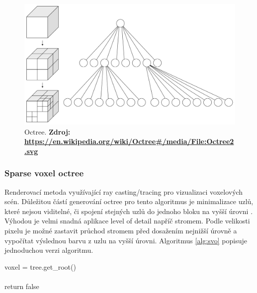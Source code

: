 \begin{figure}[H]
	\centering
	\includegraphics[scale=0.1]{obrazky-figures/Octree2.pdf}
	\caption{Octree. \textbf{Zdroj: \url{https://en.wikipedia.org/wiki/Octree#/media/File:Octree2.svg}}}
	\label{fig:slabs}
\end{figure}


\subsubsection{Sparse voxel octree}
Renderovací metoda využívající ray casting/tracing pro vizualizaci voxelových scén. Důležitou částí generování octree pro tento algoritmus je minimalizace uzlů, které nejsou viditelné, či spojení stejných uzlů do jednoho bloku na vyšší úrovni \cite{Laine2011EfficientSV}. Výhodou je velmi snadná aplikace level of detail napříč stromem. Podle velikosti pixelu je možné zastavit průchod stromem před dosažením nejnižší úrovně a vypočítat výslednou barvu z uzlu na vyšší úrovni. Algoritmus \ref{alg:svo} popisuje jednoduchou verzi algoritmu.

\begin{center}
	\begin{czechalgorithm}[H] \label{alg:svo}
	    voxel = tree.get\_root()\\
		\\
		return false
		\caption{Sparse voxel octree ray casting}
	\end{czechalgorithm}
\end{center}


